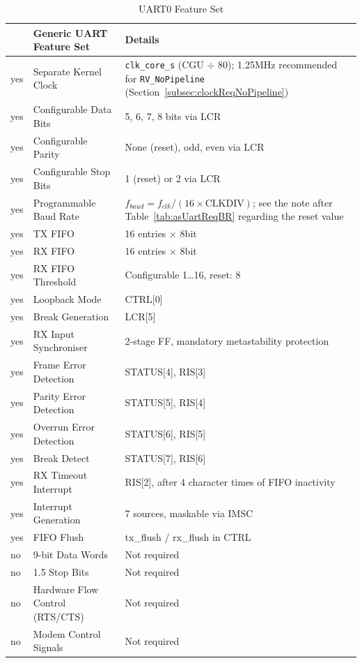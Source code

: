 \begin{table}[H]
\caption{UART0 Feature Set}
\label{tab:asUartPer01a}
\centering
\begin{tabularx}{\textwidth}{|l |l |X|}
  \hline
   & Generic UART Feature Set & Details \\
  \hline
  \hline
  yes & Separate Kernel Clock         & \texttt{clk\_core\_s} (CGU $\div$ 80); 1.25\;MHz recommended for
    \texttt{RV\_NoPipeline} (Section~\ref{subsec:clockReqNoPipeline}) \\
  \hline
  yes & Configurable Data Bits        & 5, 6, 7, 8 bits via LCR \\
  \hline
  yes & Configurable Parity           & None (reset), odd, even via LCR \\
  \hline
  yes & Configurable Stop Bits        & 1 (reset) or 2 via LCR \\
  \hline
  yes & Programmable Baud Rate        & $f_{baud} = f_{clk} / (16 \times \text{CLKDIV})$; see the note after
    Table~\ref{tab:asUartReqBR} regarding the reset value \\
  \hline
  yes & TX FIFO                       & 16 entries $\times$ 8\;bit \\
  \hline
  yes & RX FIFO                       & 16 entries $\times$ 8\;bit \\
  \hline
  yes & RX FIFO Threshold             & Configurable 1\ldots16, reset: 8 \\
  \hline
  yes & Loopback Mode                 & CTRL[0] \\
  \hline
  yes & Break Generation              & LCR[5] \\
  \hline
  yes & RX Input Synchroniser         & 2-stage FF, mandatory metastability protection \\
  \hline
  yes & Frame Error Detection         & STATUS[4], RIS[3] \\
  \hline
  yes & Parity Error Detection        & STATUS[5], RIS[4] \\
  \hline
  yes & Overrun Error Detection       & STATUS[6], RIS[5] \\
  \hline
  yes & Break Detect                  & STATUS[7], RIS[6] \\
  \hline
  yes & RX Timeout Interrupt          & RIS[2], after 4 character times of FIFO inactivity \\
  \hline
  yes & Interrupt Generation          & 7 sources, maskable via IMSC \\
  \hline
  yes & FIFO Flush                    & tx\_flush / rx\_flush in CTRL \\
  \hline
  no  & 9-bit Data Words              & Not required \\
  \hline
  no  & 1.5 Stop Bits                 & Not required \\
  \hline
  no  & Hardware Flow Control (RTS/CTS) & Not required \\
  \hline
  no  & Modem Control Signals         & Not required \\
  \hline
\end{tabularx}
\end{table}

